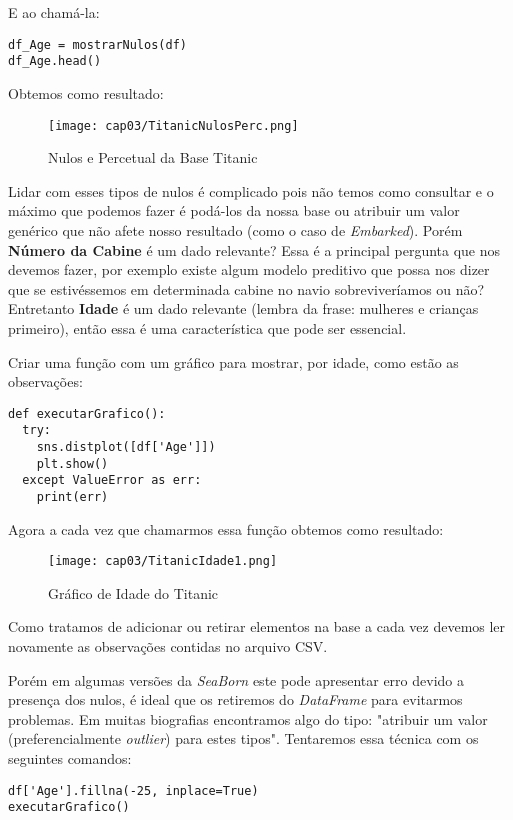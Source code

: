 E ao chamá-la:
\begin{lstlisting}[]
df_Age = mostrarNulos(df)
df_Age.head()
\end{lstlisting}

Obtemos como resultado:
\begin{figure}[H]
	\centering
	\texttt{[image: cap03/TitanicNulosPerc.png]}
	\caption{Nulos e Percetual da Base Titanic}
\end{figure}

Lidar com esses tipos de nulos é complicado pois não temos como consultar e o máximo que podemos fazer é podá-los da nossa base ou atribuir um valor genérico que não afete nosso resultado (como o caso de \textit{Embarked}). Porém \textbf{Número da Cabine} é um dado relevante? Essa é a principal pergunta que nos devemos fazer, por exemplo existe algum modelo preditivo que possa nos dizer que se estivéssemos em determinada cabine no navio sobreviveríamos ou não? Entretanto \textbf{Idade} é um dado relevante (lembra da frase: mulheres e crianças primeiro), então essa é uma característica que pode ser essencial.

Criar uma função com um gráfico para mostrar, por idade, como estão as observações:
\begin{lstlisting}[]
def executarGrafico():
  try:
    sns.distplot([df['Age']])
    plt.show()
  except ValueError as err:
    print(err) 
\end{lstlisting}

Agora a cada vez que chamarmos essa função obtemos como resultado:
\begin{figure}[H]
	\centering
	\texttt{[image: cap03/TitanicIdade1.png]}
	\caption{Gráfico de Idade do Titanic}
\end{figure}

\begin{note} 
	Como tratamos de adicionar ou retirar elementos na base a cada vez devemos ler novamente as observações contidas no arquivo CSV.
\end{note}

Porém em algumas versões da \textit{SeaBorn} este pode apresentar erro devido a presença dos nulos, é ideal que os retiremos do \textit{DataFrame} para evitarmos problemas. Em muitas biografias encontramos algo do tipo: "atribuir um valor (preferencialmente \textit{outlier}) para estes tipos". Tentaremos essa técnica com os seguintes comandos:
\begin{lstlisting}[]
df['Age'].fillna(-25, inplace=True)
executarGrafico()
\end{lstlisting}

